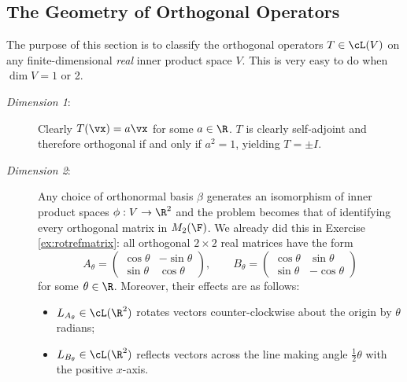 \clearpage

\iffalse

\setcounter{subsection}{10}
\subsection{The Geometry of Orthogonal Operators}

The purpose of this section is to classify the orthogonal operators $T\in\cL(V)$ on any finite-dimensional \emph{real} inner product space $V$. This is very easy to do when $\dim V=1$ or 2.

\begin{description}
	\item[\normalfont\emph{Dimension 1}:] Clearly $T(\vx)=a\vx$ for some $a\in\R$. $T$ is clearly self-adjoint and therefore orthogonal if and only if $a^2=1$, yielding $T=\pm I$.
	\item[\normalfont\emph{Dimension 2}:] Any choice of orthonormal basis $\beta$ generates an isomorphism of inner product spaces $\phi:V\to\R^2$ and the problem becomes that of identifying every orthogonal matrix in $M_2(\F)$. We already did this in Exercise \ref{ex:rotrefmatrix}: all orthogonal $2\times 2$ real matrices have the form
\[A_\theta=\begin{pmatrix}
	\cos\theta&-\sin\theta\\
	\sin\theta&\cos\theta
  \end{pmatrix},\qquad B_\theta=\begin{pmatrix}
	\cos\theta&\sin\theta\\
	\sin\theta&-\cos\theta
	\end{pmatrix}\]
for some $\theta\in\R$. Moreover, their effects are as follows:
	\begin{itemize}
	  \item $L_{A_\theta}\in\cL(\R^2)$ rotates vectors counter-clockwise about the origin by $\theta$ radians;
	  \item $L_{B_\theta}\in\cL(\R^2)$ reflects vectors across the line making angle $\frac 12\theta$ with the positive $x$-axis.
	\end{itemize}
\end{description}
	

